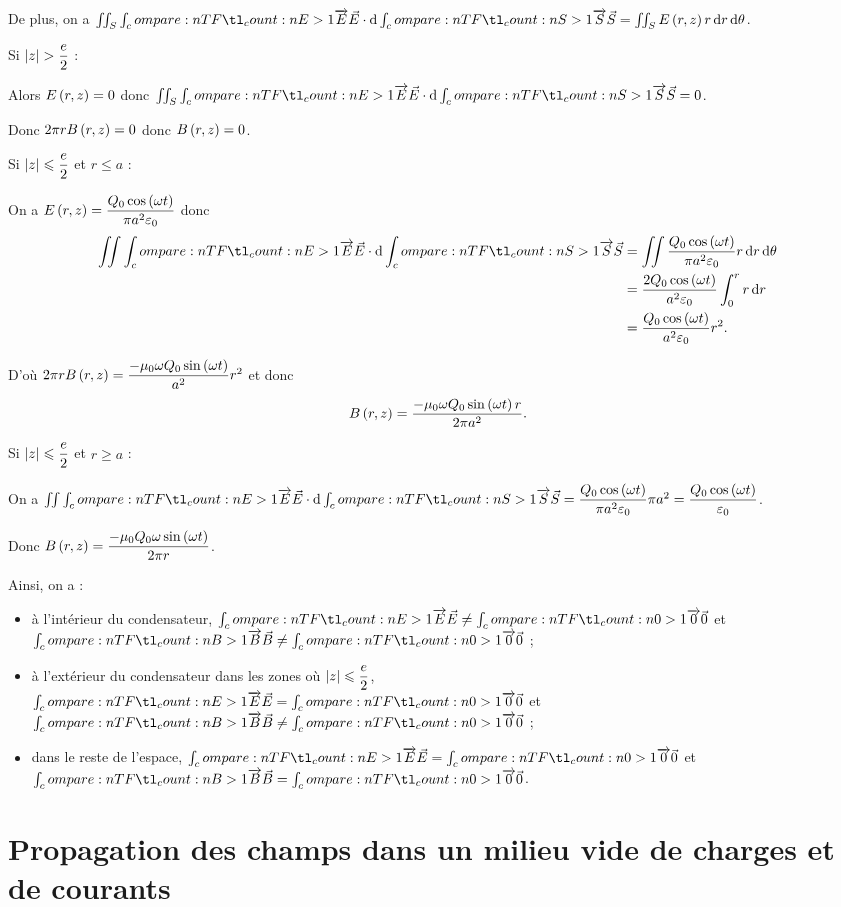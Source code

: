 De plus, on a \(\iint_S\v{E}\scal\odif{\v{S}}=\iint_SE\paren{r,z}r\odif{r}\odif{\theta}\).

Si \(\left\lvert z\right\rvert>\dfrac{e}{2}\) :

Alors \(E\left(r,z\right)=0\) donc \(\iint_S\v{E}\scal\odif{\v{S}}=0\).

Donc \(2\pi rB\left(r,z\right)=0\) donc \(B\left(r,z\right)=0\).

Si \(\left\lvert z\right\rvert\leqslant\dfrac{e}{2}\) et \(r\leq a\) :

On a \(E\left(r,z\right)=\dfrac{Q_0\cos\left(\omega t\right)}{\pi a^2\varepsilon_0}\) donc \[\begin{aligned}
\iint\v{E}\scal\odif{\v{S}}&=\iint\dfrac{Q_0\cos\paren{\omega t}}{\pi a^2\epsilon_0}r\odif{r}\odif{\theta} \\
&=\dfrac{2Q_0\cos\paren{\omega t}}{a^2\epsilon_0}\int_0^rr\odif{r} \\
&=\dfrac{Q_0\cos\paren{\omega t}}{a^2\epsilon_0}r^2.
\end{aligned}\]

D'où \(2\pi rB\left(r,z\right)=\dfrac{-\mu_0\omega Q_0\sin\left(\omega t\right)}{a^2}r^2\) et donc \[B\left(r,z\right)=\dfrac{-\mu_0\omega Q_0\sin\left(\omega t\right)r}{2\pi a^2}.\]

Si \(\left\lvert z\right\rvert\leqslant\dfrac{e}{2}\) et \(r\geq a\) :

On a \(\iint\v{E}\scal\odif{\v{S}}=\dfrac{Q_0\cos\paren{\omega t}}{\pi a^2\epsilon_0}\pi a^2=\dfrac{Q_0\cos\paren{\omega t}}{\epsilon_0}\).

Donc \(B\left(r,z\right)=\dfrac{-\mu_0Q_0\omega\sin\left(\omega t\right)}{2\pi r}\).

Ainsi, on a :

\begin{itemize}
    \item à l'intérieur du condensateur, \(\v{E}\not=\v{0}\) et \(\v{B}\not=\v{0}\) ; \\
    \item à l'extérieur du condensateur dans les zones où \(\left\lvert z\right\rvert\leqslant\dfrac{e}{2}\), \(\v{E}=\v{0}\) et \(\v{B}\not=\v{0}\) ; \\
    \item dans le reste de l'espace, \(\v{E}=\v{0}\) et \(\v{B}=\v{0}\).
\end{itemize}

\section{Propagation des champs dans un milieu vide de charges et de courants}

